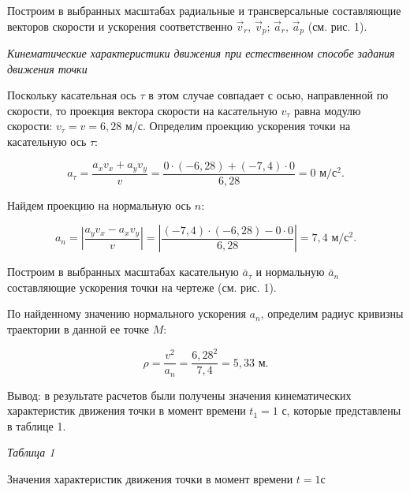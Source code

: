 \documentclass{article}
\begin{document}
Построим в выбранных масштабах радиальные и трансверсальные составляющие векторов скорости
и ускорения соответственно $\vec{v}_r\text{, }\vec{v}_p\text{; }\vec{a}_r\text{, }\vec{a}_p$
(см. рис. 1).

\bigskip

\textit{\textsf{Кинематические характеристики движения  
при естественном способе задания движения точки}}

\bigskip

Поскольку касательная ось $\tau$ в этом случае совпадает с осью, направленной по скорости,
то проекция вектора скорости на касательную $v_\tau$ равна модулю скорости:
$v_\tau = v = 6,28$ м/с.
\newpage
Определим проекцию ускорения точки на касательную ось $\tau$:

$$a_\tau=\frac{a_xv_x+a_yv_y}{v}=\frac{0\cdot (-6,28) + (-7,4)\cdot 0}{6,28}=0\text{ м/с$^2$.}$$

Найдем проекцию на нормальную ось $n$:

$$a_n=\left|\frac{a_yv_x-a_xv_y}{v}\right|=\left|\frac{(-7,4)\cdot (-6,28)-0\cdot 0}{6,28}\right|=7,4\text{ м/с$^2$.}$$

Построим в выбранных масштабах касательную $\bar{a}_\tau$ и нормальную $\bar{a}_n$
составляющие ускорения точки на чертеже (см. рис. 1).

По найденному значению нормального ускорения $a_n$, определим радиус кривизны 
траектории в данной ее точке $M$:

$$\rho = \frac{v^2}{a_n}=\frac{6,28^2}{7,4}=5,33\text{ м.}$$


Вывод: в результате расчетов были получены значения кинематических характеристик движения точки
в момент времени $t_1=1$ с, которые представлены в таблице 1.

\begin{flushright}
  \small\textit{Таблица 1} \hspace*{0.4cm}
\end{flushright}

\vspace*{-0.9cm}

\begin{center}
  Значения характеристик движения точки в момент времени $t=1$с
\end{center}
\end{document}
